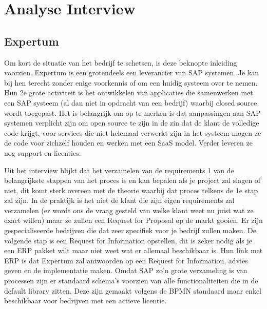 
\chapter{Analyse Interview}
\label{ch:analyse_interview}

\section{Expertum}

Om kort de situatie van het bedrijf te schetsen, is deze beknopte inleiding voorzien. Expertum is een grotendeels een leverancier van SAP systemen. Je kan bij hen terecht zonder enige voorkennis of om een huidig systeem over te nemen. Hun 2e grote activiteit is het ontwikkelen van applicaties die samenwerken met een SAP systeem (al dan niet in opdracht van een bedrijf) waarbij closed source wordt toegepast. Het is belangrijk om op te merken is dat aanpassingen aan SAP systemen verplicht zijn om open source te zijn in de zin dat de klant de volledige code krijgt, voor services die niet helemaal verwerkt zijn in het systeem mogen ze de code voor zichzelf houden en werken met een SaaS model. Verder leveren ze nog support en licenties.

Uit het interview blijkt dat het verzamelen van de requirements 1 van de belangrijkste stappen van het proces is en kan bepalen als je project zal slagen of niet, dit komt sterk overeen met de theorie waarbij dat proces telkens de 1e stap zal zijn. In de praktijk is het niet de klant die zijn eigen requirements zal verzamelen (er wordt ons de vraag gesteld van welke klant weet nu juist wat ze exact willen) maar ze zullen een Request for Proposal op de markt gooien. Er zijn gespecialiseerde bedrijven die dat zeer specifiek voor je bedrijf zullen maken. De volgende stap is een Request for Information opstellen, dit is zeker nodig als je een ERP pakket wilt maar niet weet wat er allemaal beschikbaar is. Hun link met ERP is dat Expertum zal antwoorden op een Request for Information, advies geven en de implementatie maken. Omdat SAP zo'n grote verzameling is van processen zijn er standaard schema's voorzien van alle functionaliteiten die in de default library zitten. Deze zijn gemaakt volgens de BPMN standaard maar enkel beschikbaar voor bedrijven met een actieve licentie. 

